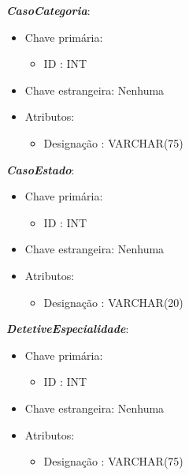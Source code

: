 \documentclass[a4paper,12pt]{scrreprt}
\begin{document}
        \textbf{\textit{CasoCategoria}}:
        \begin{itemize}
            \item Chave primária:
                \begin{itemize}
                    \item ID : INT
                \end{itemize}
            \item Chave estrangeira: Nenhuma
            \item Atributos:
                \begin{itemize}
                    \item Designação : VARCHAR(75)
                \end{itemize}
        \end{itemize}

        \vspace{0.5cm}
        
        \textbf{\textit{CasoEstado}}:
        \begin{itemize}
            \item Chave primária:
                \begin{itemize}
                    \item ID : INT
                \end{itemize}
            \item Chave estrangeira: Nenhuma
            \item Atributos:
                \begin{itemize}
                    \item Designação : VARCHAR(20)
                \end{itemize}
        \end{itemize}

        \vspace{0.5cm}
        
        \textbf{\textit{DetetiveEspecialidade}}:
        \begin{itemize}
            \item Chave primária:
                \begin{itemize}
                    \item ID : INT
                \end{itemize}
            \item Chave estrangeira: Nenhuma
            \item Atributos:
                \begin{itemize}
                    \item Designação : VARCHAR(75)
                \end{itemize}
        \end{itemize}
\end{document}
